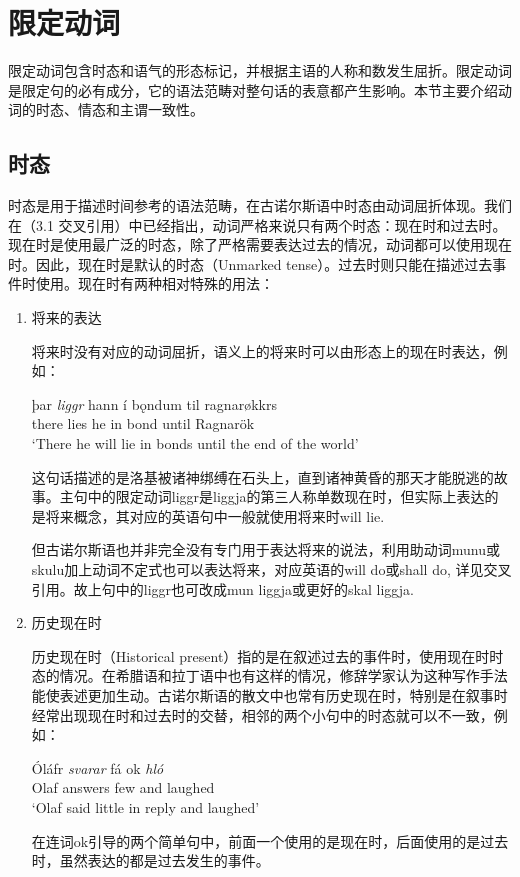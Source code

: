 \section{限定动词}
限定动词包含时态和语气的形态标记，并根据主语的人称和数发生屈折。限定动词是限定句的必有成分，它的语法范畴对整句话的表意都产生影响。本节主要介绍动词的时态、情态和主谓一致性。
\subsection{时态}
时态是用于描述时间参考的语法范畴，在古诺尔斯语中时态由动词屈折体现。我们在（3.1 交叉引用）中已经指出，动词严格来说只有两个时态：现在时和过去时。现在时是使用最广泛的时态，除了严格需要表达过去的情况，动词都可以使用现在时。因此，现在时是默认的时态（Unmarked tense）。过去时则只能在描述过去事件时使用。现在时有两种相对特殊的用法：
\begin{enumerate}
\setlength{\parindent}{2em}
    \item 将来的表达

    将来时没有对应的动词屈折，语义上的将来时可以由形态上的现在时表达，例如：
    \begin{exe}
    \ex
    \gll þar	\textit{liggr}	hann	í	bǫndum	til	ragnarøkkrs\\
    there	lies	he	in	bond	until	Ragnarök\\
    \trans `There he will lie in bonds until the end of the world'
    \end{exe}


    这句话描述的是洛基被诸神绑缚在石头上，直到诸神黄昏的那天才能脱逃的故事。主句中的限定动词liggr是liggja的第三人称单数现在时，但实际上表达的是将来概念，其对应的英语句中一般就使用将来时will lie.
    
    但古诺尔斯语也并非完全没有专门用于表达将来的说法，利用助动词munu或skulu加上动词不定式也可以表达将来，对应英语的will do或shall do, 详见交叉引用。故上句中的liggr也可改成mun liggja或更好的skal liggja.

    \item 历史现在时

    历史现在时（Historical present）指的是在叙述过去的事件时，使用现在时时态的情况。在希腊语和拉丁语中也有这样的情况，修辞学家认为这种写作手法能使表述更加生动。古诺尔斯语的散文中也常有历史现在时，特别是在叙事时经常出现现在时和过去时的交替，相邻的两个小句中的时态就可以不一致，例如：
    
    \begin{exe}
    \ex
    \gll  Óláfr	\textit{svarar}	fá	ok	\textit{hló}\\
    Olaf	answers	few	and	laughed\\
    \trans `Olaf said little in reply and laughed’
    \end{exe}
    
    在连词ok引导的两个简单句中，前面一个使用的是现在时，后面使用的是过去时，虽然表达的都是过去发生的事件。
  
\end{enumerate}
